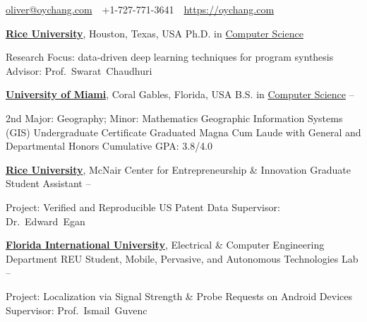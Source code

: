 \documentclass[letterpaper,MMMyyyy,nonstopmode]{simpleresumecv}
\newcommand{\CVAuthor}{Oliver Chang}
\newcommand{\CVWebpage}{https://oychang.com}
\begin{document}

\Title{\CVAuthor}

\begin{SubTitle}
\href{mailto:oliver@oychang.com}{oliver@oychang.com}
\,\SubBulletSymbol\,
+1-727-771-3641
\,\SubBulletSymbol\,
\href{\CVWebpage}
{\url{\CVWebpage}}
\end{SubTitle}

\begin{Body}



\Entry
\href{http://www.rice.edu/}{\textbf{Rice University}},
Houston, Texas, USA
\Gap
\BulletItem
Ph.D. in \href{http://www.cs.rice.edu/}{Computer Science}
\hfill
\textit{}
\begin{Detail}
\SubBulletItem Research Focus: data-driven deep learning techniques for program synthesis
\SubBulletItem Advisor: Prof.~Swarat~Chaudhuri
\end{Detail}

\BigGap

\Entry
\href{http://welcome.miami.edu/}{\textbf{University of Miami}},
Coral Gables, Florida, USA
\Gap
\BulletItem
B.S. in \href{http://www.as.miami.edu/csc/}{Computer Science}
\hfill
{} -- 
\begin{Detail}
\SubBulletItem 2nd Major: Geography; Minor: Mathematics
\SubBulletItem Geographic Information Systems (GIS) Undergraduate Certificate
\SubBulletItem Graduated Magna Cum Laude with General and Departmental Honors
\SubBulletItem Cumulative GPA: 3.8/4.0
\end{Detail}



\Entry
\href{http://www.rice.edu/}{\textbf{Rice University}}, McNair Center for Entrepreneurship \& Innovation
\Gap
\BulletItem Graduate Student Assistant
\hfill {} -- 
\begin{Detail}
\SubBulletItem
Project: Verified and Reproducible US Patent Data
\SubBulletItem
Supervisor: Dr.~Edward~Egan
\end{Detail}

\Entry
\href{http://www.fiu.edu/}{\textbf{Florida International University}}, Electrical \& Computer Engineering Department
\Gap
\BulletItem REU Student, Mobile, Pervasive, and Autonomous Technologies Lab
\hfill {} -- 
\begin{Detail}
\SubBulletItem
Project: Localization via Signal Strength \& Probe Requests on Android Devices
\SubBulletItem
Supervisor: Prof.~Ismail~Guvenc
\end{Detail}


\end{Body}
\end{document}
